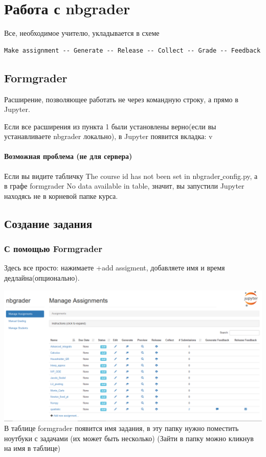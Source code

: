 \documentclass[a4paper,12pt]{article}
\begin{document}
\section{Работа с nbgrader}

Все, необходимое учителю, укладывается в схеме
\begin{verbatim}
Make assignment -- Generate -- Release -- Collect -- Grade -- Feedback
\end{verbatim}
\subsection{Formgrader}

Расширение, позволяющее работать не через командную строку, а прямо в Jupyter. 

Если все расширения из пункта 1 были установлены верно(если вы устанавливаете nbgrader локально), в Jupyter появится вкладка:
v
\paragraph{Возможная проблема (не для сервера)}
Если вы видите табличку \grqq The course id has not been set in nbgrader\underline{ }config.py\grqq, а в графе formgrader \grqq No data available in table\grqq , значит, вы запустили Jupyter находясь не в корневой папке курса.
\subsection{Создание задания}
\subsubsection{С помощью Formgrader}

Здесь все просто: нажимаете +add assigment, добавляете имя и время дедлайна(опционально).

\includegraphics[width=\textwidth]{formgrader_tab2}
В таблице formgrader появится имя задания, в эту папку нужно поместить ноутбуки с задачами (их может быть несколько)
(Зайти в папку можно кликнув на имя в таблице)
\end{document}
